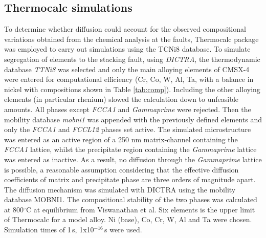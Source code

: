 \documentclass[a4paper,12pt,times,numbered,print,index]{Classes/PhDThesisPSnPDF}
\begin{document}
\subsection*{Thermocalc simulations}
To determine whether diffusion could account for the observed compositional variations obtained from the chemical analysis at the faults, Thermocalc package was employed to carry out simulations using the TCNi8 database.
To simulate segregation of elements to the stacking fault, using \textit{DICTRA}, the thermodynamic database \textit{TTNi8} was selected and only the main alloying elements of CMSX-4 were entered for computational efficiency (Cr, Co, W, Al, Ta, with a balance in nickel with compositions shown in Table \ref{tab:comp}). Including the other alloying elements (in particular rhenium) slowed the calculation down to unfeasible amounts. All phases except \textit{FCC\textunderscore A1} and \textit{Gamma\textunderscore prime} were rejected. Then the mobility database \textit{mobni1} was appended with the previously defined elements and only the \textit{FCC\textunderscore A1} and \textit{FCC\textunderscore L12} phases set active. 
The simulated microstructure was entered as an active region of a 250 nm matrix-channel containing the \textit{FCC\textunderscore A1} lattice, whilst the precipitate region containing the \textit{Gamma\textunderscore prime} lattice was entered as inactive. As a result, no diffusion through the \textit{Gamma\textunderscore prime} lattice is possible, a reasonable assumption considering that the effective diffusion coefficients of matrix and precipitate phase are three orders of magnitude apart.\\
The diffusion mechanism was simulated with DICTRA using the mobility database MOBNI1.\cite{engstrom1994computer} The compositional stability of the two phases was calculated at 800$^\circ$C at equilibrium from Viswanathan et al.\cite{viswanathan2015segregation} Six elements is the upper limit of Thermocalc for a model alloy. Ni (base), Co, Cr, W, Al and Ta were chosen. Simulation times of 1\,s, 1x10$^{-16}$\,s were used.
\end{document}
